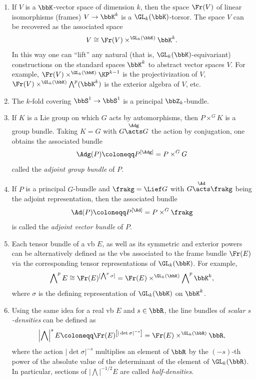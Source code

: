 \begin{example}\label{ex associated bundles}
    \begin{enumerate}
        \item If $V$ is a $\bbK$-vector space of dimension $k$, then the space $\Fr(V)$ of linear isomorphisms (frames) $V\to \bbK^k$ is a $\GL_k(\bbK)$-torsor. The space $V$ can be recovered as the associated space
        \[V\cong \Fr(V)\times^{\GL_k(\bbK)} \bbK^k.\]
        In this way one can ``lift'' any natural (that is, $\GL_k(\bbK)$-equivariant) constructions on the standard spaces $\bbK^k$ to abstract vector spaces $V$. For example, $\Fr(V)\times^{\GL_k(\bbK)} \KP^{k-1}$ is the projectivization of $V$, $\Fr(V)\times^{\GL_k(\bbK)}\bigwedge\nolimits^p(\bbK^k)$ is the exterior algebra of $V$, etc.
        
        \item The $k$-fold covering $\bbS^1\to \bbS^1$ is a principal $\bbZ_k$-bundle.
        
        \item If $K$ is a Lie group on which $G$ acts by automorphisms, then $P\times^G K$ is a group bundle. Taking $K=G$ with $G\overset{\Adg}{\acts}G$ the action by conjugation, one obtains the associated bundle \[\Adg(P)\coloneqq P^{[\Adg]}=P\times^G G\]
        called the \emph{adjoint group bundle} of $P$. 

        \item If $P$ is a principal $G$-bundle and $\frakg=\Lief G$ with $G\overset{\Ad}{\acts}\frakg$ being the adjoint representation, then the associated bundle \[\Ad(P)\coloneqq P^{[\Ad]}=P\times^G \frakg\] is called the \emph{adjoint vector bundle} of $P$. 
       
        \item Each tensor bundle of a \gls{vb} $E$, as well as its symmetric and exterior powers can be alternatively defined as the \glspl{vb} associated to the frame bundle $\Fr(E)$ via the corresponding tensor representations of $\GL_k(\bbK)$. For example, \[\bigwedge\nolimits^p E\cong \Fr(E)^{[\bigwedge\nolimits^p \sigma]}=\Fr(E)\times^{\GL_k(\bbK)} \bigwedge\nolimits^p \bbK^k,\]
        where $\sigma$ is the defining representation of $\GL_k(\bbK)$ on $\bbK^k$. 
        
        \item Using the same idea for a real \gls{vb} $E$ and $s\in\bbR$, the line bundles of \emph{scalar $s$-densities} can be defined as
        \[\left|\bigwedge\right|^s E\coloneqq \Fr(E)^{\left[|\det \sigma|^{-s}\right]}=\Fr(E)\times^{\GL_k(\bbR)}\bbR,\]
        where the action $|\det \sigma|^{-s}$ multiplies an element of $\bbR$ by the $(-s)$-th power of the absolute value of the determinant of the element of $\GL_k(\bbR)$. In particular, sections of $\left|\bigwedge\right|^{-1/2}E$ are called \emph{half-densities}.
        

\end{enumerate}
\end{example}

